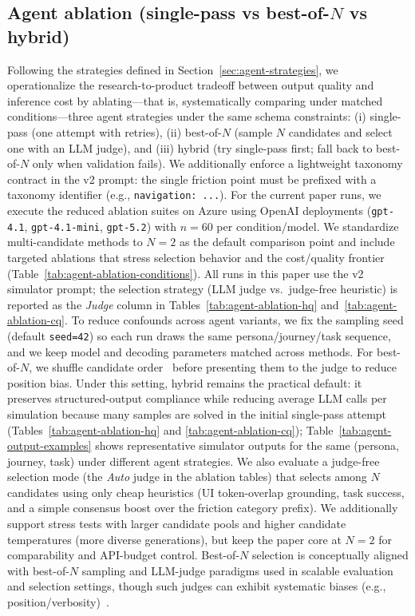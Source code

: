 \subsection{Agent ablation (single-pass vs best-of-\texorpdfstring{$N$}{N} vs hybrid)}
Following the strategies defined in Section~\ref{sec:agent-strategies}, we operationalize the research-to-product tradeoff between output quality and inference cost by ablating---that is, systematically comparing under matched conditions---three agent strategies under the same schema constraints:
(i) single-pass (one attempt with retries), (ii) best-of-$N$ (sample $N$ candidates and select one with an LLM judge), and (iii) hybrid (try single-pass first; fall back to best-of-$N$ only when validation fails).
We additionally enforce a lightweight taxonomy contract in the v2 prompt: the single friction point must be prefixed with a taxonomy identifier (e.g., \texttt{navigation: ...}).
For the current paper runs, we execute the reduced ablation suites on Azure using OpenAI deployments (\texttt{gpt-4.1}, \texttt{gpt-4.1-mini}, \texttt{gpt-5.2}) with $n=60$ per condition/model. We standardize multi-candidate methods to $N=2$ as the default comparison point and include targeted ablations that stress selection behavior and the cost/quality frontier (Table~\ref{tab:agent-ablation-conditions}). All runs in this paper use the v2 simulator prompt; the selection strategy (LLM judge vs.\ judge-free heuristic) is reported as the \emph{Judge} column in Tables~\ref{tab:agent-ablation-hq} and~\ref{tab:agent-ablation-cq}.
To reduce confounds across agent variants, we fix the sampling seed (default \texttt{seed=42}) so each run draws the same persona/journey/task sequence, and we keep model and decoding parameters matched across methods.
For best-of-$N$, we shuffle candidate order~\cite{shi2024positionbias} before presenting them to the judge to reduce position bias.
Under this setting, hybrid remains the practical default: it preserves structured-output compliance while reducing average LLM calls per simulation because many samples are solved in the initial single-pass attempt (Tables~\ref{tab:agent-ablation-hq} and \ref{tab:agent-ablation-cq}); Table~\ref{tab:agent-output-examples} shows representative simulator outputs for the same (persona, journey, task) under different agent strategies.
We also evaluate a judge-free selection mode (the \emph{Auto} judge in the ablation tables) that selects among $N$ candidates using only cheap heuristics (UI token-overlap grounding, task success, and a simple consensus boost over the friction category prefix).
We additionally support stress tests with larger candidate pools and higher candidate temperatures (more diverse generations), but keep the paper core at $N=2$ for comparability and API-budget control.
Best-of-$N$ selection is conceptually aligned with best-of-$N$ sampling and LLM-judge paradigms used in scalable evaluation and selection settings, though such judges can exhibit systematic biases (e.g., position/verbosity)~\cite{wang2023selfconsistency,liu2023geval,zheng2023mtbench,shi2024positionbias}.
